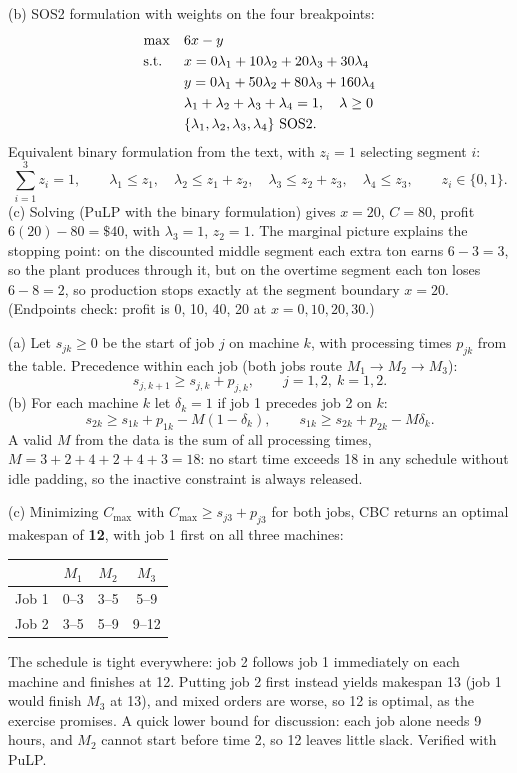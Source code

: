 (b) SOS2 formulation with weights on the four breakpoints:
\[
\begin{aligned}
\max\quad & 6x - y\\
\text{s.t.}\;\;\quad & x = 0\lambda_1 + 10\lambda_2 + 20\lambda_3 + 30\lambda_4\\
& y = 0\lambda_1 + 50\lambda_2 + 80\lambda_3 + 160\lambda_4\\
& \lambda_1 + \lambda_2 + \lambda_3 + \lambda_4 = 1,\quad \lambda \geq 0\\
& \{\lambda_1, \lambda_2, \lambda_3, \lambda_4\} \text{ SOS2}.
\end{aligned}
\]
Equivalent binary formulation from the text, with $z_i = 1$ selecting segment $i$:
\[
\sum_{i=1}^{3} z_i = 1,\qquad
\lambda_1 \leq z_1,\quad \lambda_2 \leq z_1 + z_2,\quad \lambda_3 \leq z_2 + z_3,\quad \lambda_4 \leq z_3,\qquad z_i \in \{0,1\}.
\]
(c) Solving (PuLP with the binary formulation) gives $x = 20$, $C = 80$, profit $6(20) - 80 = \$40$, with $\lambda_3 = 1$, $z_2 = 1$. The marginal picture explains the stopping point: on the discounted middle segment each extra ton earns $6 - 3 = 3$, so the plant produces through it, but on the overtime segment each ton loses $6 - 8 = 2$, so production stops exactly at the segment boundary $x = 20$. (Endpoints check: profit is 0, 10, 40, 20 at $x = 0, 10, 20, 30$.)


(a) Let $s_{jk} \geq 0$ be the start of job $j$ on machine $k$, with processing times $p_{jk}$ from the table. Precedence within each job (both jobs route $M_1 \to M_2 \to M_3$):
\[
s_{j,k+1} \geq s_{j,k} + p_{j,k}, \qquad j = 1,2,\ k = 1,2.
\]
(b) For each machine $k$ let $\delta_k = 1$ if job 1 precedes job 2 on $k$:
\[
s_{2k} \geq s_{1k} + p_{1k} - M(1 - \delta_k),
\qquad
s_{1k} \geq s_{2k} + p_{2k} - M\delta_k.
\]
A valid $M$ from the data is the sum of all processing times, $M = 3+2+4+2+4+3 = 18$: no start time exceeds 18 in any schedule without idle padding, so the inactive constraint is always released.

(c) Minimizing $C_{\max}$ with $C_{\max} \geq s_{j3} + p_{j3}$ for both jobs, CBC returns an optimal makespan of \textbf{12}, with job 1 first on all three machines:
\begin{center}
\begin{tabular}{l|ccc}
 & $M_1$ & $M_2$ & $M_3$\\
\hline
Job 1 & 0--3 & 3--5 & 5--9\\
Job 2 & 3--5 & 5--9 & 9--12\\
\end{tabular}
\end{center}
The schedule is tight everywhere: job 2 follows job 1 immediately on each machine and finishes at 12. Putting job 2 first instead yields makespan 13 (job 1 would finish $M_3$ at 13), and mixed orders are worse, so 12 is optimal, as the exercise promises. A quick lower bound for discussion: each job alone needs 9 hours, and $M_2$ cannot start before time 2, so 12 leaves little slack. Verified with PuLP.
